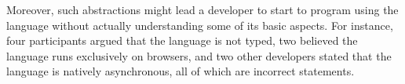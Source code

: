 Moreover, such abstractions might lead a developer to start to program
using the language without actually understanding some of its basic aspects.
For instance, four participants argued that the language is not typed, two  believed the language runs exclusively on browsers, and two other developers stated that the language is natively asynchronous, all of which are incorrect statements.




